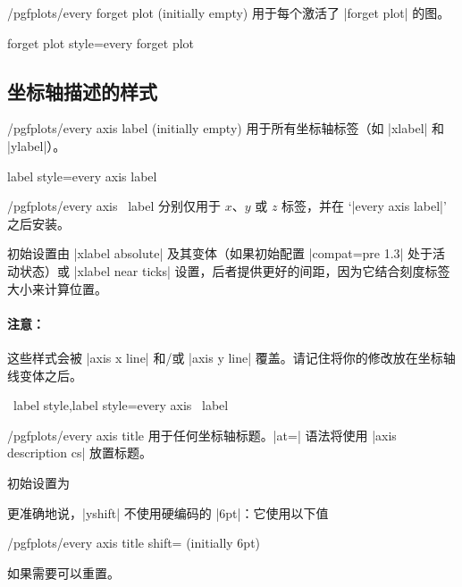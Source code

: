 \begin{stylekey}{/pgfplots/every forget plot (initially empty)}
    用于每个激活了 |forget plot| 的图。
\end{stylekey}

\pgfplotsshortstylekey forget plot style=every forget plot\pgfeov


\subsection*{坐标轴描述的样式}

\begin{stylekey}{/pgfplots/every axis label (initially empty)}
    用于所有坐标轴标签（如 |xlabel| 和 |ylabel|）。
\end{stylekey}

\pgfplotsshortstylekey label style=every axis label\pgfeov

\begin{xystylekey}{/pgfplots/every axis \x\ label}
    分别仅用于 $x$、$y$ 或 $z$ 标签，并在 `|every axis label|' 之后安装。

    初始设置由 |xlabel absolute| 及其变体（如果初始配置 |compat=pre 1.3| 处于活动状态）或 |xlabel near ticks| 设置，后者提供更好的间距，因为它结合刻度标签大小来计算位置。


    \paragraph{注意：}

    这些样式会被 |axis x line| 和/或 |axis y line| 覆盖。请记住将你的修改放在坐标轴线变体之后。
\end{xystylekey}

\pgfplotsshortxystylekeys \x\ label style,\x label style=every axis \x\ label\pgfeov

\begin{stylekey}{/pgfplots/every axis title}
    用于任何坐标轴标题。|at=| 语法将使用 |axis description cs| 放置标题。

    初始设置为
\begin{codeexample}
\end{codeexample}

    更准确地说，|yshift| 不使用硬编码的 |6pt|：它使用以下值

    \begin{key}{/pgfplots/every axis title shift= (initially 6pt)}
    \end{key}

    如果需要可以重置。
\end{stylekey}

